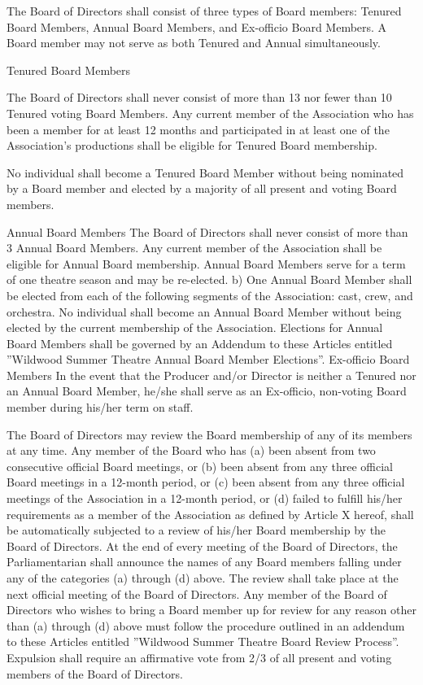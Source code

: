 \documentclass{article}
\begin{document}
\begin{outline}[enumerate]
\1 The Board of Directors shall consist of three types of Board members:
Tenured Board Members, Annual Board Members, and Ex-officio Board Members.  A
Board member may not serve as both Tenured and Annual simultaneously.

\2 Tenured Board Members

\3 The Board of Directors shall never consist of more than 13 nor fewer than
10 Tenured voting Board Members.  Any current member of the Association who has
been a member for at least 12 months and participated in at least one of the
Association's productions shall be eligible for Tenured Board membership.

\3 No individual shall become a Tenured Board Member without being nominated by
a Board member and elected by a majority of all present and voting Board
members.

\2 Annual Board Members
\3 The Board of Directors shall never consist of more than 3 Annual Board
Members.  Any current member of the Association shall be eligible for Annual
Board membership.  Annual Board Members serve for a term of one theatre season
and may be re-elected.  b)	One Annual Board Member shall be elected from each
of the following segments of the Association: cast, crew, and orchestra.
\3 No individual shall become an Annual Board Member without being elected by
the current membership of the Association.  Elections for Annual Board Members
shall be governed by an Addendum to these Articles entitled ''Wildwood Summer
Theatre Annual Board Member Elections''.
\2 Ex-officio Board Members
\3 In the event that the Producer and/or Director is neither a Tenured nor an
Annual Board Member, he/she shall serve as an Ex-officio, non-voting Board
member during his/her term on staff.

\1 The Board of Directors may review the Board membership of any of its members at any time.
\2 Any member of the Board who has (a) been absent from two consecutive official Board meetings, or (b) been absent from any three official Board meetings in a 12-month period, or (c) been absent from any three official meetings of the Association in a 12-month period, or (d) failed to fulfill his/her requirements as a member of the Association as defined by Article X hereof, shall be automatically subjected to a review of his/her Board membership by the Board of Directors.
\2 At the end of every meeting of the Board of Directors, the Parliamentarian shall announce the names of any Board members falling under any of the categories (a) through (d) above.  The review shall take place at the next official meeting of the Board of Directors.
\2 Any member of the Board of Directors who wishes to bring a Board member up for review for any reason other than (a) through (d) above must follow the procedure outlined in an addendum to these Articles entitled ''Wildwood Summer Theatre Board Review Process''.
\2 Expulsion shall require an affirmative vote from 2/3 of all present and voting members of the Board of Directors.


\end{outline}
\end{document}

